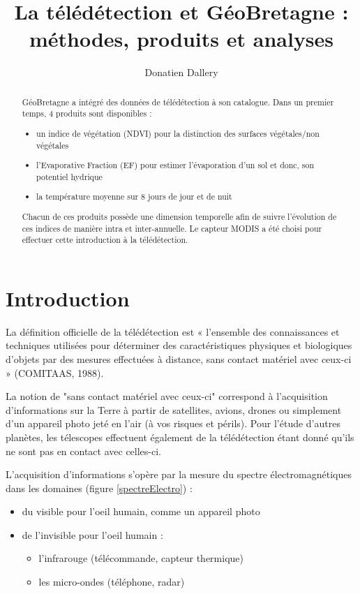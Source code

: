 \documentclass[10pt,a4paper]{article}
\author{Donatien Dallery}
\title{La télédétection et GéoBretagne : méthodes, produits et analyses}
\begin{document}
\maketitle

\begin{abstract}
GéoBretagne a intégré des données de télédétection à son catalogue. Dans un premier temps, 4 produits sont disponibles : 
\begin{itemize}
\item un indice de végétation (NDVI) pour la distinction des surfaces végétales/non végétales
\item l'Evaporative Fraction (EF) pour estimer l'évaporation d'un sol et donc, son potentiel hydrique
\item la température moyenne sur 8 jours de jour et de nuit
\end{itemize}

Chacun de ces produits possède une dimension temporelle afin de suivre l'évolution de ces indices de manière intra et inter-annuelle. Le capteur MODIS a été choisi pour effectuer cette introduction à la télédétection.
\end{abstract}

\section{Introduction}

La définition officielle de la télédétection est « l’ensemble des connaissances et techniques utilisées pour déterminer des caractéristiques physiques et biologiques d’objets par des mesures effectuées à distance, sans contact matériel avec ceux-ci » (COMITAAS, 1988).\smallbreak

La notion de "sans contact matériel avec ceux-ci" correspond à l'acquisition d'informations sur la Terre à partir de satellites, avions, drones ou simplement d'un appareil photo jeté en l'air (à vos risques et périls). Pour l'étude d'autres planètes, les télescopes effectuent également de la télédétection étant donné qu'ils ne sont pas en contact avec celles-ci.\smallbreak

L'acquisition d'informations s'opère par la mesure du spectre électromagnétiques dans les domaines (figure \ref{spectreElectro}) :

\begin{itemize}
\item du visible pour l'oeil humain, comme un appareil photo
\item de l'invisible pour l'oeil humain :
\begin{itemize}
\item l'infrarouge (télécommande, capteur thermique)
\item les micro-ondes (téléphone, radar)
\end{itemize}
\end{itemize}
\end{document}
